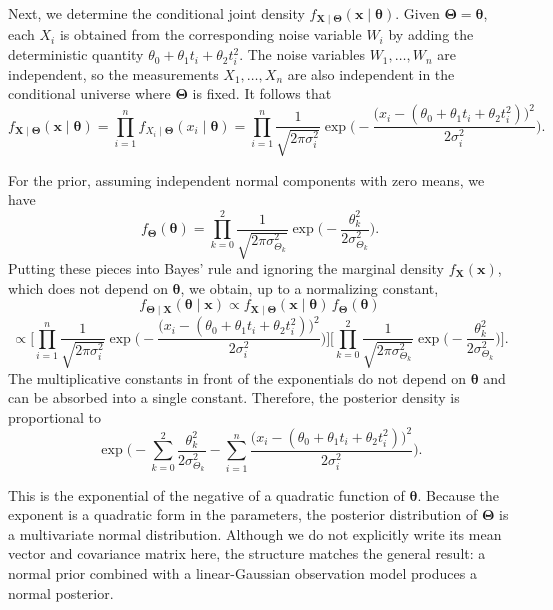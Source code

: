 Next, we determine the conditional joint density \(f_{\mathbf{X}\mid \boldsymbol{\Theta}}(\mathbf{x}\mid \boldsymbol{\theta})\).  
Given \(\boldsymbol{\Theta} = \boldsymbol{\theta}\), each \(X_{i}\) is obtained from the corresponding noise variable \(W_{i}\) by adding the deterministic quantity \(\theta_{0} + \theta_{1} t_{i} + \theta_{2} t_{i}^{2}\).  
The noise variables \(W_{1},\dots,W_{n}\) are independent, so the measurements \(X_{1},\dots,X_{n}\) are also independent in the conditional universe where \(\boldsymbol{\Theta}\) is fixed.  
It follows that
\[
f_{\mathbf{X}\mid \boldsymbol{\Theta}}(\mathbf{x}\mid \boldsymbol{\theta})
=
\prod_{i=1}^{n}
f_{X_{i}\mid \boldsymbol{\Theta}}(x_{i}\mid \boldsymbol{\theta})
=
\prod_{i=1}^{n}
\frac{1}{\sqrt{2\pi\sigma_{i}^{2}}}
\exp\Bigg(
-\frac{\big(x_{i} - (\theta_{0} + \theta_{1} t_{i} + \theta_{2} t_{i}^{2})\big)^{2}}{2\sigma_{i}^{2}}
\Bigg).
\]

For the prior, assuming independent normal components with zero means, we have
\[
f_{\boldsymbol{\Theta}}(\boldsymbol{\theta})
=
\prod_{k=0}^{2}
\frac{1}{\sqrt{2\pi\sigma_{\Theta_{k}}^{2}}}
\exp\Big(-\frac{\theta_{k}^{2}}{2\sigma_{\Theta_{k}}^{2}}\Big).
\]
Putting these pieces into Bayes' rule and ignoring the marginal density \(f_{\mathbf{X}}(\mathbf{x})\), which does not depend on \(\boldsymbol{\theta}\), we obtain, up to a normalizing constant,
\[
f_{\boldsymbol{\Theta}\mid \mathbf{X}}(\boldsymbol{\theta}\mid \mathbf{x})
\propto
f_{\mathbf{X}\mid \boldsymbol{\Theta}}(\mathbf{x}\mid \boldsymbol{\theta})\,f_{\boldsymbol{\Theta}}(\boldsymbol{\theta})
\]
\[
\propto
\Bigg[
\prod_{i=1}^{n}
\frac{1}{\sqrt{2\pi\sigma_{i}^{2}}}
\exp\Bigg(
-\frac{\big(x_{i} - (\theta_{0} + \theta_{1} t_{i} + \theta_{2} t_{i}^{2})\big)^{2}}{2\sigma_{i}^{2}}
\Bigg)
\Bigg]
\Bigg[
\prod_{k=0}^{2}
\frac{1}{\sqrt{2\pi\sigma_{\Theta_{k}}^{2}}}
\exp\Big(-\frac{\theta_{k}^{2}}{2\sigma_{\Theta_{k}}^{2}}\Big)
\Bigg].
\]
The multiplicative constants in front of the exponentials do not depend on \(\boldsymbol{\theta}\) and can be absorbed into a single constant.  
Therefore, the posterior density is proportional to
\[
\exp\Bigg(
-\sum_{k=0}^{2}\frac{\theta_{k}^{2}}{2\sigma_{\Theta_{k}}^{2}}
-
\sum_{i=1}^{n}
\frac{\big(x_{i} - (\theta_{0} + \theta_{1} t_{i} + \theta_{2} t_{i}^{2})\big)^{2}}{2\sigma_{i}^{2}}
\Bigg).
\]

This is the exponential of the negative of a quadratic function of \(\boldsymbol{\theta}\).  
Because the exponent is a quadratic form in the parameters, the posterior distribution of \(\boldsymbol{\Theta}\) is a multivariate normal distribution.  
Although we do not explicitly write its mean vector and covariance matrix here, the structure matches the general result: a normal prior combined with a linear-Gaussian observation model produces a normal posterior.

